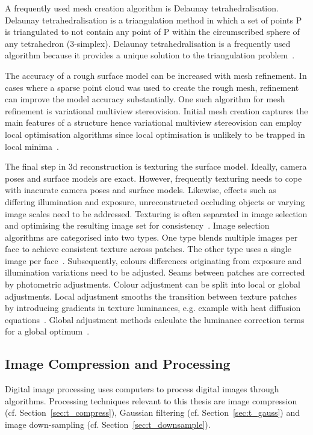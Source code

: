 A frequently used mesh creation algorithm is Delaunay tetrahedralisation. Delaunay tetrahedralisation is a triangulation method in which a set of points \gls{P} is triangulated to not contain any point of \gls{P} within the circumscribed sphere of any tetrahedron (3-simplex). Delaunay tetrahedralisation is a frequently used algorithm because it provides a unique solution to the triangulation problem~\cite{vu2012high}.

The accuracy of a rough surface model can be increased with mesh refinement. In cases where a sparse point cloud was used to create the rough mesh, refinement can improve the model accuracy substantially. One such algorithm for mesh refinement is variational multiview stereovision. Initial mesh creation captures the main features of a structure hence variational multiview stereovision can employ local optimisation algorithms since local optimisation is unlikely to be trapped in local minima~\cite{Faugeras1998VariationalProblem, vu2012high}.

The final step in \gls{3d} reconstruction is texturing the surface model. Ideally, camera poses and surface models are exact. However, frequently texturing needs to cope with inacurate camera poses and surface models. Likewise, effects such as differing illumination and exposure, unreconstructed occluding objects or varying image scales need to be addressed. Texturing is often separated in image selection and optimising the resulting image set for consistency~\cite{Waechter2014LetReconstructions}. Image selection algorithms are categorised into two types. One type blends multiple images per face to achieve consistent texture across patches. The other type uses a single image per face~\cite{Waechter2014LetReconstructions}.
Subsequently, colours differences originating from exposure and illumination variations need to be adjusted. Seams between patches are corrected by photometric adjustments. Colour adjustment can be split into local or global adjustments. Local adjustment smooths the transition between texture patches by introducing gradients in texture luminances, e.g. example with heat diffusion equations~\cite{Velho2007ProjectivePhotography}. Global adjustment methods calculate the luminance correction terms for a global optimum~\cite{Lempitsky2007SeamlessMaps}.

\subsection{Image Compression and Processing}
Digital image processing uses computers to process digital images through algorithms. Processing techniques relevant to this thesis are image compression (cf. Section~\ref{sec:t_compress}), Gaussian filtering  (cf. Section~\ref{sec:t_gauss}) and image down-sampling  (cf. Section~\ref{sec:t_downsample}).

